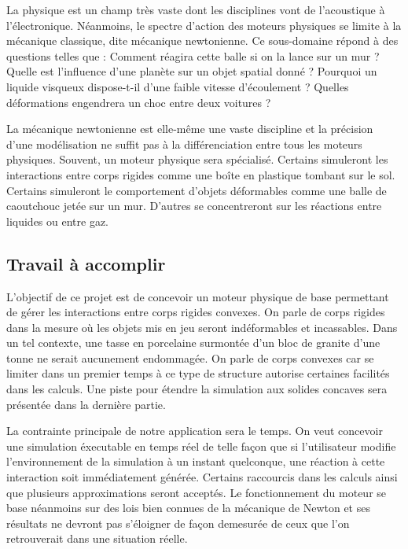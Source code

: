 La physique est un champ très vaste dont les disciplines vont de l'acoustique à l'électronique. Néanmoins, le spectre d'action des moteurs physiques se limite à la mécanique classique, dite mécanique newtonienne. Ce sous-domaine répond à des questions telles que : Comment réagira cette balle si on la lance sur un mur ? Quelle est l'influence d'une planète sur un objet spatial donné ? Pourquoi un liquide visqueux dispose-t-il d'une faible vitesse d'écoulement ? Quelles déformations engendrera un choc entre deux voitures ?

La mécanique newtonienne est elle-même une vaste discipline et la précision d'une modélisation ne suffit pas à la différenciation entre tous les moteurs physiques. Souvent, un moteur physique sera spécialisé. Certains simuleront les interactions entre corps rigides comme une boîte en plastique tombant sur le sol. Certains simuleront le comportement d'objets déformables comme une balle de caoutchouc jetée sur un mur. D'autres se concentreront sur les réactions entre liquides ou entre gaz.

\subsection{Travail à accomplir}

L'objectif de ce projet est de concevoir un moteur physique de base permettant de gérer les interactions entre corps rigides convexes. On parle de corps rigides dans la mesure o\`u les objets mis en jeu seront indéformables et incassables. Dans un tel contexte, une tasse en porcelaine surmontée d'un bloc de granite d'une tonne ne serait aucunement endommagée. On parle de corps convexes car se limiter dans un premier temps à ce type de structure autorise certaines facilités dans les calculs. Une piste pour étendre la simulation aux solides concaves sera présentée dans la dernière partie.

La contrainte principale de notre application sera le temps. On veut concevoir une simulation éxecutable en temps réel de telle façon que si l'utilisateur modifie l'environnement de la simulation à un instant quelconque, une réaction à cette interaction soit immédiatement générée. Certains raccourcis dans les calculs ainsi que plusieurs approximations seront acceptés. Le fonctionnement du moteur se base néanmoins sur des lois bien connues de la mécanique de Newton et ses résultats ne devront pas s'éloigner de façon demesurée de ceux que l'on retrouverait dans une situation réelle.

